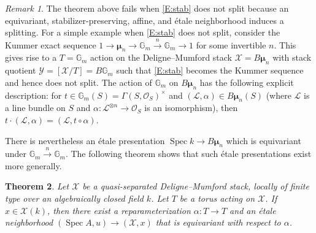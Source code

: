 \documentclass[a4paper]{amsart}
\theoremstyle{plain}
\newtheorem{theorem}{Theorem}[section]
\theoremstyle{definition}
\theoremstyle{remark}
\newtheorem{remark}[theorem]{Remark}
\numberwithin{equation}{section}
\newcommand{\GG}{\mathbb{G}}
\newcommand\cL{\mathcal{L}}
\newcommand\cX{\mathcal{X}}
\newcommand\cY{\mathcal{Y}}
\newcommand\oh{\mathcal{O}}
\newcommand\co{\colon}
\DeclareMathOperator{\Spec}{Spec}
\newcommand{\Gmu}{\pmb{\mu}}
\newcommand{\tensor}{\otimes}
\begin{document}
\begin{remark} \label{R:not-split}
The theorem above fails when \eqref{E:stab} does not split because an equivariant, stabilizer-preserving, affine, and \'etale neighborhood induces a splitting. For a simple example when \eqref{E:stab} does not split, consider the Kummer exact sequence $1 \to \Gmu_n \to \GG_m \xrightarrow{n}  \GG_m \to 1$ for some invertible $n$. This gives rise to a $T=\GG_m$ action on the Deligne--Mumford stack $\cX=B\Gmu_n$ with stack quotient $\cY=[\cX/T]=B\GG_m$ such that  \eqref{E:stab} becomes the Kummer sequence and hence does not split. The action of $\GG_m$ on $B\Gmu_n$ has the following explicit description:  for $t \in \GG_m(S) = \Gamma(S, \oh_S)^\times$ and $(\cL, \alpha) \in B\Gmu_n(S)$ (where $\cL$ is a line bundle on $S$ and $\alpha \co \cL^{\tensor n} \to \oh_S$ is an isomorphism), then $t \cdot (\cL, \alpha) = (\cL, t \circ \alpha)$.

There is nevertheless an \'etale presentation $\Spec k \to B \Gmu_n$ which is equivariant under $\GG_m \xrightarrow{n} \GG_m$.  The following theorem shows that such \'etale presentations exist more generally.\end{remark}

\begin{theorem} \label{T:sumi2}
Let $\cX$ be a quasi-separated Deligne--Mumford stack, locally of finite type over an algebraically closed field $k$. Let $T$ be a torus acting on $\cX$.  If $x\in \cX(k)$, then there exist a reparameterization $\alpha \co T \to T$ and an \'etale neighborhood $(\Spec A, u) \to (\cX,x)$ that is equivariant with respect to $\alpha$.
\end{theorem}
\end{document}
